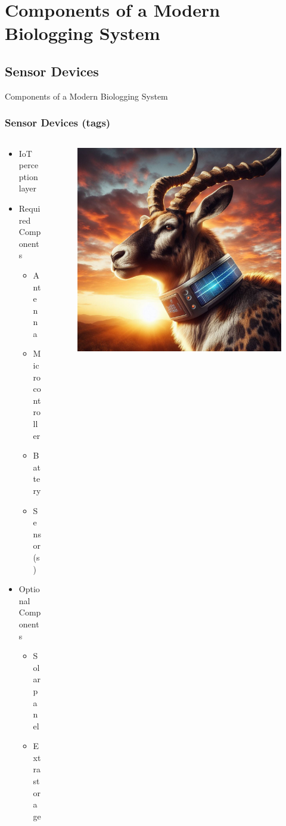 \documentclass{beamer}
\begin{document}
\section{Components of a Modern Biologging System}

\subsection{Sensor Devices}

  \begin{frame}{Components of a Modern Biologging System}
    \frametitle{Sensor Devices (tags)}
    \begin{columns}
      \begin{column}{.5\textwidth}
        \begin{itemize}
          \item IoT perception layer 
          \item Required Components
          \begin{itemize}
            \item Antenna
            \item Microcontroller
            \item Battery
            \item Sensor(s)
          \end{itemize}
          \item Optional Components
          \begin{itemize}
            \item Solar panel
            \item Extra storage
          \end{itemize}
        \end{itemize}
      \end{column}
      \begin{column}{0.5\textwidth}
        \begin{figure}[htbp]
          \centering
          \includegraphics[height=.6\textheight]{images/Solar_collar.jpg}

\end{figure}
\end{column}
\end{columns}
\end{frame}
\end{document}
